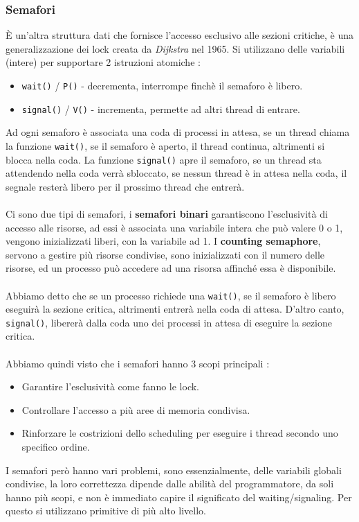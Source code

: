 \documentclass[12pt, letterpaper]{article}
\newcommand{\code}[1]{\colorbox{light-gray}{\texttt{#1}}}
\newcommand{\acc}{\\\hphantom{}\\}
\begin{document}
\subsubsection{Semafori}
È un'altra struttura dati che fornisce l'accesso esclusivo alle sezioni critiche, è una generalizzazione dei lock 
creata da \textit{Dijkstra} nel 1965. Si utilizzano delle variabili (intere) per supportare 2 
istruzioni atomiche :\begin{itemize}
    \item \code{wait()} / \code{P()} - decrementa, interrompe finchè il semaforo è libero. 
    \item \code{signal()} / \code{V()} - incrementa, permette ad altri thread di entrare. 
\end{itemize}
Ad ogni semaforo è associata una coda di processi in attesa, se un thread chiama la funzione \code{wait()}, se il semaforo 
è aperto, il thread continua, altrimenti si blocca nella coda. La funzione \code{signal()} apre il semaforo, se un 
thread sta attendendo nella coda verrà sbloccato, se nessun thread è in attesa nella coda, il segnale resterà libero 
per il prossimo thread che entrerà. \acc 
Ci sono due tipi di semafori, i \textbf{semafori binari} garantiscono l'esclusività di accesso alle risorse, ad essi 
è associata una variabile intera che può valere 0 o 1, vengono inizializzati liberi, con la variabile ad 1. I 
\textbf{counting semaphore}, servono a gestire più risorse condivise, sono inizializzati con il numero delle risorse, ed 
un processo può accedere ad una risorsa affinché essa è disponibile.\acc 
Abbiamo detto che se un processo richiede una \code{wait()}, se il semaforo è libero eseguirà la sezione critica, altrimenti 
entrerà nella coda di attesa. D'altro canto, \code{signal()}, libererà dalla coda uno dei processi in attesa di 
eseguire la sezione critica.\acc 
Abbiamo quindi visto che i semafori hanno 3 scopi principali : \begin{itemize}
    \item Garantire l'esclusività come fanno le lock.
    \item Controllare l'accesso a più aree di memoria condivisa. 
    \item Rinforzare le costrizioni dello scheduling per eseguire i thread secondo uno specifico ordine.
\end{itemize}
I semafori però hanno vari problemi, sono essenzialmente, delle variabili globali condivise, la loro correttezza dipende 
dalle abilità del programmatore, da soli hanno più scopi, e non è immediato capire il significato del waiting\slash signaling.
Per questo si utilizzano primitive di più alto livello.
\end{document}
